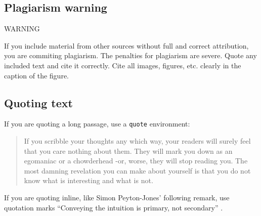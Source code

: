 \subsection{Plagiarism warning}

\begin{highlight_title}{WARNING}
    
    If you include material from other sources without full and correct attribution, you are commiting plagiarism. The penalties for plagiarism are severe.
    Quote any included text and cite it correctly. Cite all images, figures, etc. clearly in the caption of the figure.
\end{highlight_title}

\subsection{Quoting text}

If you are quoting a long passage, use a \texttt{quote} environment:

\begin{quote}
     If you scribble your thoughts any which way, your readers will surely feel that you care nothing about them. They will mark you down as an egomaniac or a chowderhead -or, worse, they will stop reading you. The most damning revelation you can make about yourself is that you do not know what is interesting and what is not.
\end{quote} \citep{Von80}

If you are quoting inline, like Simon Peyton-Jones' following remark, use quotation marks ``Conveying the intuition is primary, not
secondary'' \citep{Pey17}.